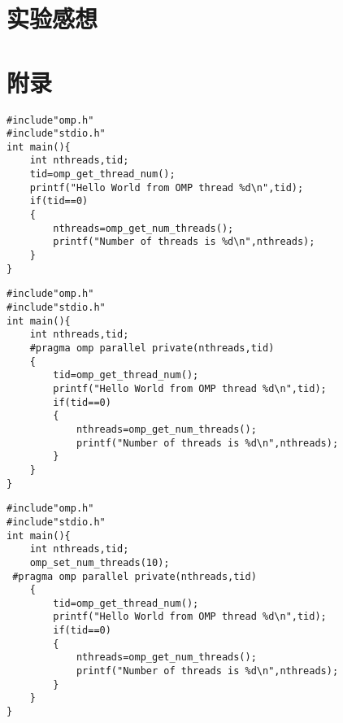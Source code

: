 \documentclass{article}
\begin{document}
\subsection{}
\subsection{}
\section{实验感想}
\newpage
\appendix
\section{附录}
\noindent
\begin{minipage}[t]{0.45\textwidth}
    \begin{lstlisting}[style=cstyle,caption={串行Helloworld}]
#include"omp.h"
#include"stdio.h"
int main(){
    int nthreads,tid;
    tid=omp_get_thread_num();
    printf("Hello World from OMP thread %d\n",tid);
    if(tid==0)
    {
        nthreads=omp_get_num_threads();
        printf("Number of threads is %d\n",nthreads);
    }
}
    \end{lstlisting}
\end{minipage}
\hfill 
\begin{minipage}[t]{0.45\textwidth}
    \begin{lstlisting}[style=cstyle,caption={不设线程并行Helloworld}]
#include"omp.h"
#include"stdio.h"
int main(){
    int nthreads,tid;
    #pragma omp parallel private(nthreads,tid)
    {
        tid=omp_get_thread_num();
        printf("Hello World from OMP thread %d\n",tid);
        if(tid==0)
        {
            nthreads=omp_get_num_threads();
            printf("Number of threads is %d\n",nthreads);
        }
    }
}
    \end{lstlisting}
\end{minipage}
\begin{lstlisting}[style=cstyle,caption={设置10个线程并行Helloworld}]
#include"omp.h"
#include"stdio.h"
int main(){
    int nthreads,tid;
    omp_set_num_threads(10);
 #pragma omp parallel private(nthreads,tid)
    {
        tid=omp_get_thread_num();
        printf("Hello World from OMP thread %d\n",tid);
        if(tid==0)
        {
            nthreads=omp_get_num_threads();
            printf("Number of threads is %d\n",nthreads);
        }
    }
}
\end{lstlisting}
\end{document}
